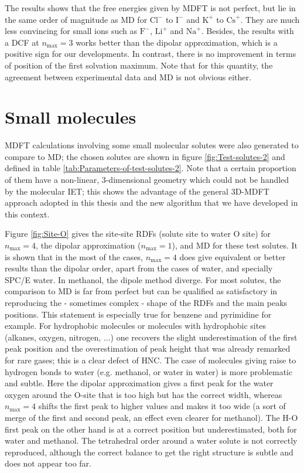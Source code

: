 The results shows that the free energies given by \acs{MDFT} is not
perfect, but lie in the same order of magnitude as \acs{MD} for $\mathrm{Cl}^{-}$
to $\mathrm{I}^{-}$ and $\mathrm{K}^{+}$ to $\mathrm{Cs}^{+}$.
They are much less convincing for small ions such as $\mathrm{F}^{-}$,
$\mathrm{Li}^{+}$ and $\mathrm{Na}^{+}$. Besides, the results with
a \acs{DCF} at $n_{\max}=3$ works better than the dipolar approximation,
which is a positive sign for our developments. In contrast, there
is no improvement in terms of position of the first solvation maximum.
Note that for this quantity, the agreement between experimental data
and \acs{MD} is not obvious either. 

\section{Small molecules}

\acs{MDFT} calculations involving some small molecular solutes were
also generated to compare to \acs{MD}; the chosen solutes are shown
in figure \ref{fig:Test-solutes-2} and defined in table \ref{tab:Parameters-of-test-solutes-2}.
Note that a certain proportion of them have a non-linear, 3-dimensional
geometry which could not be handled by the molecular \acs{IET}; this
shows the advantage of the general 3D-\acs{MDFT} approach adopted
in this thesis and the new algorithm that we have developed in this
context.

Figure \ref{fig:Site-O} gives the site-site \acs{RDF}s (solute site
to water O site) for $n_{\max}=4$, the dipolar approximation ($n_{\max}=1$),
and \acs{MD} for these test solutes. It is shown that in the most
of the cases, $n_{\max}=4$ does give equivalent or better results
than the dipolar order, apart from the cases of water, and specially
SPC/E water. In methanol, the dipole method diverge. For most solutes,
the comparison to \acs{MD} is far from perfect but can be qualified
as satisfactory in reproducing the - sometimes complex - shape of
the \acs{RDF}s and the main peaks positions. This statement is especially
true for benzene and pyrimidine for example. For hydrophobic molecules
or molecules with hydrophobic sites (alkanes, oxygen, nitrogen, ...)
one recovers the slight underestimation of the first peak position
and the overestimation of peak height that was already remarked for
rare gases; this is a clear defect of \acs{HNC}. The case of molecules
giving raise to hydrogen bonds to water (e.g. methanol, or water in
water) is more problematic and subtle. Here the dipolar approximation
gives a first peak for the water oxygen around the O-site that is
too high but has the correct width, whereas $n_{\max}=4$ shifts the
first peak to higher values and makes it too wide (a sort of merge
of the first and second peak, an effect even clearer for methanol).
The H-O first peak on the other hand is at a correct position but
underestimated, both for water and methanol. The tetrahedral order
around a water solute is not correctly reproduced, although the correct
balance to get the right structure is subtle and does not appear too
far. 

